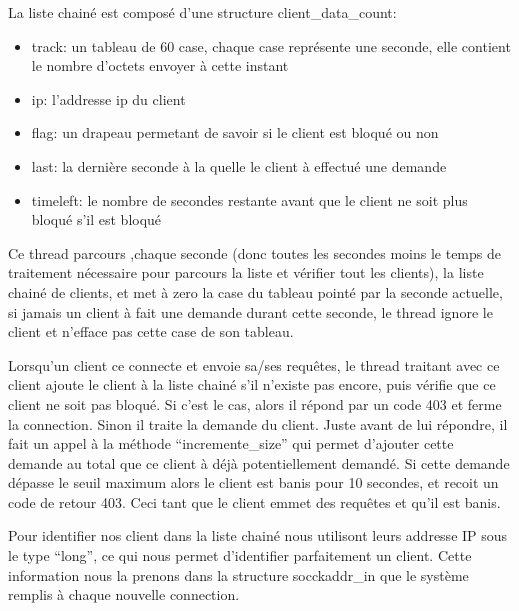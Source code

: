 \documentclass{article}
\begin{document}
La liste chainé est composé d'une structure client\_data\_count:

\begin{itemize}
\item track: un tableau de 60 case, chaque case représente une seconde, elle contient le nombre d'octets envoyer à cette instant
\item ip: l'addresse ip du client
\item flag: un drapeau permetant de savoir si le client est bloqué ou non
\item last: la dernière seconde à la quelle le client à effectué une demande
\item timeleft: le nombre de secondes restante avant que le client ne soit plus bloqué s'il est bloqué
\end{itemize}

Ce thread parcours ,chaque seconde (donc toutes les secondes moins le temps de traitement nécessaire pour parcours la liste et vérifier tout les clients), la liste chainé de clients, et met à zero la case du tableau pointé par la seconde actuelle, si jamais un client à fait une demande durant cette seconde, le thread ignore le client et n'efface pas cette case de son tableau.\hbox{}

Lorsqu'un client ce connecte et envoie sa/ses requêtes, le thread traitant avec ce client ajoute le client à la liste chainé s'il n'existe pas encore, puis vérifie que ce client ne soit pas bloqué. Si c'est le cas, alors il répond par un code 403 et ferme la connection. Sinon il traite la demande du client. Juste avant de lui répondre, il fait un appel à la méthode ``incremente\_size'' qui permet d'ajouter cette demande au total que ce client à déjà potentiellement demandé. Si cette demande dépasse le seuil maximum alors le client est banis pour 10 secondes, et recoit un code de retour 403. Ceci tant que le client emmet des requêtes et qu'il est banis.\hbox{}

Pour identifier nos client dans la liste chainé nous utilisont leurs addresse IP sous le type ``long'', ce qui nous permet d'identifier parfaitement un client. Cette information nous la prenons dans la structure socckaddr\_in que le système remplis à chaque nouvelle connection.\hbox{}
\end{document}
